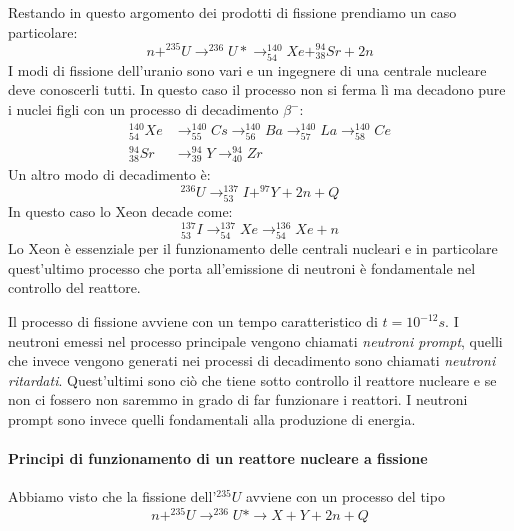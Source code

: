 Restando in questo argomento dei prodotti di fissione prendiamo un caso particolare:
\begin{equation}
n+^{235}U \longrightarrow ^{236}U*\longrightarrow^{140}_{54}Xe+^{94}_{38}Sr+2n
\end{equation}
I modi di fissione dell'uranio sono vari e un ingegnere di una centrale nucleare deve conoscerli tutti. In questo caso il processo non si ferma lì ma decadono pure i nuclei figli con un processo di decadimento $\beta^-$:
\begin{equation}
\begin{split}
^{140}_{54}Xe &\longrightarrow ^{140}_{55}Cs \longrightarrow ^{140}_{56}Ba \longrightarrow ^{140}_{57}La \longrightarrow ^{140}_{58}Ce\\
^{94}_{38}Sr&\longrightarrow^{94}_{39}Y \longrightarrow^{94}_{40}Zr
\end{split}
\end{equation}
Un altro modo di decadimento è:
\begin{equation}
^{236}U\longrightarrow^{137}_{53}I+^{97}Y+2n+Q
\end{equation}
In questo caso lo Xeon decade come:
\begin{equation}
^{137}_{53}I \longrightarrow^{137}_{54}Xe\longrightarrow^{136}_{54}Xe+n
\end{equation}
Lo Xeon è essenziale per il funzionamento delle centrali nucleari e in particolare quest'ultimo processo che porta all'emissione di neutroni è fondamentale nel controllo del reattore.

Il processo di fissione avviene con un tempo caratteristico di $t=10^{-12}s$.
I neutroni emessi nel processo principale vengono chiamati \emph{neutroni prompt}, quelli che invece vengono generati nei processi di decadimento sono chiamati \emph{neutroni ritardati}.
Quest'ultimi sono ciò che tiene sotto controllo il reattore nucleare e se non ci fossero non saremmo in grado di far funzionare i reattori.
I neutroni prompt sono invece quelli fondamentali alla produzione di energia.

\paragraph{Principi di funzionamento di un reattore nucleare a fissione}
Abbiamo visto che la fissione dell'$^{235}U$ avviene con un processo del tipo
\begin{equation}
n+^{235}U\longrightarrow^{236}U*\longrightarrow X+Y+2n+Q
\end{equation}

